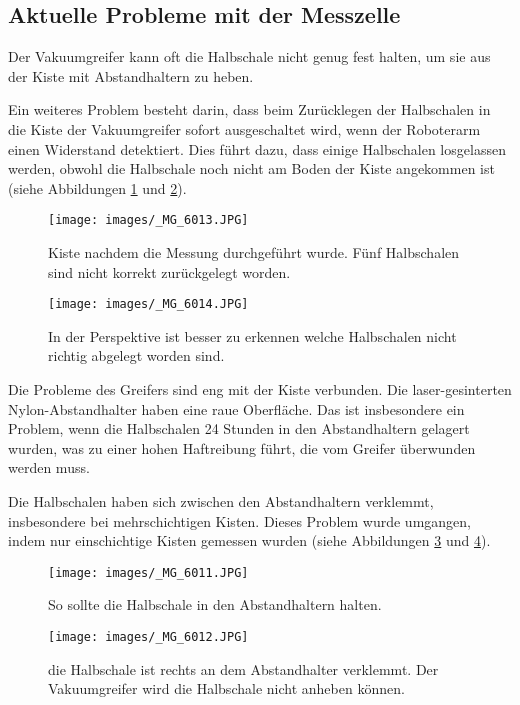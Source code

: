 \subsection{Aktuelle Probleme mit der Messzelle}
Der Vakuumgreifer kann oft die Halbschale nicht genug fest halten, um sie aus der Kiste mit Abstandhaltern zu heben.

Ein weiteres Problem besteht darin, dass beim Zurücklegen der Halbschalen in die Kiste der Vakuumgreifer sofort ausgeschaltet wird, wenn der Roboterarm einen Widerstand detektiert. Dies führt dazu, dass einige Halbschalen losgelassen werden, obwohl die Halbschale noch nicht am Boden der Kiste angekommen ist (siehe Abbildungen \ref{fig:ProbRob} und \ref{fig:ProbRobPer}).

\begin{figure}
   
  \texttt{[image: images/\_MG\_6013.JPG]}
  \caption{Kiste nachdem die Messung durchgeführt wurde. Fünf Halbschalen sind nicht korrekt zurückgelegt worden.}
  \label{fig:ProbRob}
\end{figure}


\begin{figure}
   
  \texttt{[image: images/\_MG\_6014.JPG]}
  \caption{In der Perspektive ist besser zu erkennen welche Halbschalen nicht richtig abgelegt worden sind.}
  \label{fig:ProbRobPer}
\end{figure}

Die Probleme des Greifers sind eng mit der Kiste verbunden. Die laser-gesinterten Nylon-Abstandhalter haben eine raue Oberfläche. Das ist insbesondere ein Problem, wenn die Halbschalen 24 Stunden in den Abstandhaltern gelagert wurden, was zu einer hohen Haftreibung führt, die vom Greifer überwunden werden muss.


Die Halbschalen haben sich zwischen den Abstandhaltern verklemmt, insbesondere bei mehrschichtigen Kisten. Dieses Problem wurde umgangen, indem nur einschichtige Kisten gemessen wurden (siehe Abbildungen \ref{fig:ProbGut} und \ref{fig:ProbProb}).

\label{ProblemeVersuch}
\begin{figure}
   
  \texttt{[image: images/\_MG\_6011.JPG]}
  \caption{So sollte die Halbschale in den Abstandhaltern halten.}
  \label{fig:ProbGut}
\end{figure}

\begin{figure}
   
  \texttt{[image: images/\_MG\_6012.JPG]}
  \caption{die Halbschale ist rechts an dem Abstandhalter verklemmt. Der Vakuumgreifer wird die Halbschale nicht anheben können.}
  \label{fig:ProbProb}
\end{figure}


